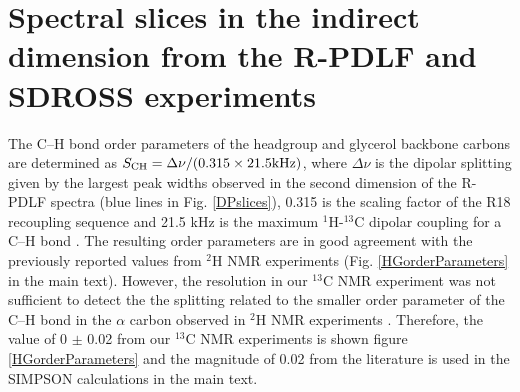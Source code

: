 \documentclass[journal=jpcbfk]{achemso}
\begin{document}
\pagebreak
\section{Spectral slices in the indirect dimension from the R-PDLF and SDROSS experiments}

The C--H bond order parameters of the headgroup and glycerol backbone carbons are determined 
as $S_{\rm CH}=\Delta\nu/(0.315\times21.5  {\rm kHz})$, where $\Delta\nu$ is the dipolar splitting
given by the largest peak widths observed in the second dimension of the R-PDLF spectra
(blue lines in Fig. \ref{DPslices}), 0.315 is the scaling factor of the R18 recoupling sequence 
and 21.5 kHz is the maximum $^1$H-$^{13}$C dipolar coupling for a C--H bond \cite{dvinskikh04}.
The resulting order parameters are in good agreement with the previously reported values
from $^2$H NMR experiments \cite{browning80} (Fig. \ref{HGorderParameters} in the main text).
However, the resolution in our $^{13}$C NMR experiment was not sufficient to detect the
the splitting related to the smaller order parameter of the C--H bond in the $\alpha$ carbon
observed in $^2$H NMR experiments \cite{browning80}. Therefore, the value of  0 $\pm$ 0.02 from our
$^{13}$C NMR experiments is shown figure \ref{HGorderParameters} 
and the magnitude of 0.02 from the literature is used in the SIMPSON calculations in the main text.
\end{document}

